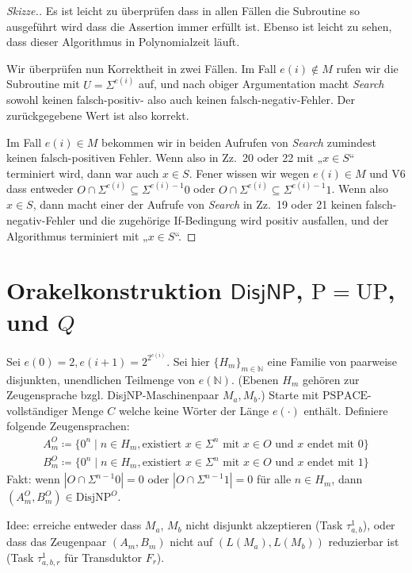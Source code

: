 \documentclass[nofonts]{uebung}
\theoremstyle{definition}
\def\P{\ensuremath{\mathrm{P}}}
\def\UP{\ensuremath{\mathrm{UP}}}
\def\DisjNP{\ensuremath{\mathrm{DisjNP}}}
\def\hDisjNP{\ensuremath{\mathsf{DisjNP}}}
\begin{document}
\begin{proof}[Skizze.]
    Es ist leicht zu überprüfen dass in allen Fällen die Subroutine so ausgeführt wird dass die Assertion immer erfüllt ist.
    Ebenso ist leicht zu sehen, dass dieser Algorithmus in Polynomialzeit läuft.

    Wir überprüfen nun Korrektheit in zwei Fällen.
    Im Fall $e(i)\not\in M$ rufen wir die Subroutine mit $U=\Sigma^{e(i)}$ auf, und nach obiger Argumentation macht \emph{Search} sowohl keinen falsch-positiv- also auch keinen falsch-negativ-Fehler.
    Der zurückgegebene Wert ist also korrekt.

    Im Fall $e(i)\in M$ bekommen wir in beiden Aufrufen von \emph{Search} zumindest keinen falsch-positiven Fehler. Wenn also in Zz.~20 oder 22 mit „$x\in S$“ terminiert wird, dann war auch $x\in S$.
    Fener wissen wir wegen $e(i)\in M$ und V6 dass entweder $O\cap\Sigma^{e(i)}\subseteq \Sigma^{e(i)-1}0$ oder $O\cap\Sigma^{e(i)}\subseteq \Sigma^{e(i)-1}1$.
    Wenn also $x\in S$, dann macht einer der Aufrufe von \emph{Search} in Zz.~19 oder 21 keinen falsch-negativ-Fehler und die zugehörige If-Bedingung wird positiv ausfallen, und der Algorithmus terminiert mit „$x\in S$“.
\end{proof}

\clearpage
\section{Orakelkonstruktion $\hDisjNP$, $\P=\UP$, und $Q$}

Sei $e(0)=2, e(i+1)=2^{2^{e(i)}}$. Sei hier $\{H_m\}_{m\in\mathbb N}$ eine Familie von paarweise disjunkten, unendlichen Teilmenge von $e(\mathbb N)$. (Ebenen $H_m$ gehören zur Zeugensprache bzgl. DisjNP-Maschinenpaar $M_a, M_b$.)
Starte mit $\mathrm{PSPACE}$-vollständiger Menge $C$ welche keine Wörter der Länge $e(\cdot)$ enthält.
Definiere folgende Zeugensprachen:
        \begin{gather*}
            A_m^O \coloneqq \{ 0^n \mid n\in H_m, \text{existiert $x\in \Sigma^{n}$ mit } x\in O \text{ und $x$ endet mit $0$} \}\\
            B_m^O \coloneqq \{ 0^n \mid n\in H_m, \text{existiert $x\in \Sigma^{n}$ mit } x\in O \text{ und $x$ endet mit $1$} \}
        \end{gather*}
        Fakt: wenn $|O\cap \Sigma^{n-1}0|=0$ oder $|O\cap \Sigma^{n-1}1|=0$ für alle $n\in H_m$, dann $(A_m^O, B_m^O)\in\DisjNP^O$.
\medskip

Idee: erreiche entweder dass $M_a$, $M_b$ nicht disjunkt akzeptieren (Task $\tau^1_{a,b}$), oder dass das Zeugenpaar $(A_m,B_m)$ nicht auf $(L(M_a),L(M_b))$ reduzierbar ist (Task $\tau^1_{a,b,r}$ für Transduktor $F_r$).
\end{document}
